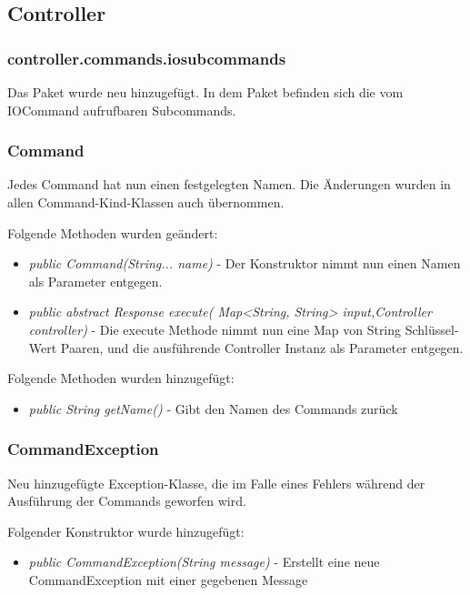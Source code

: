 \documentclass[parskip=full]{scrartcl}
\begin{document}
		\subsection{Controller}
		
		
			\subsubsection{controller.commands.iosubcommands}
				\hypertarget{controller:controller.commands.iosubcommands}{}
				Das Paket wurde neu hinzugefügt. In dem Paket befinden sich die vom IOCommand aufrufbaren Subcommands.
				
		
			\subsubsection{Command}
			\hypertarget{controller:commandSection}{}
				Jedes Command hat nun einen festgelegten Namen. Die Änderungen wurden in allen Command-Kind-Klassen auch übernommen.

				Folgende Methoden wurden geändert:
				\begin{itemize}
					\item \textit{public Command(String... name)} - Der Konstruktor nimmt nun einen Namen als Parameter entgegen.
					\item \textit{public abstract Response execute(	Map<String, String> input,Controller controller)} - Die execute Methode nimmt nun eine Map von String Schlüssel-Wert Paaren, und die ausführende Controller Instanz als Parameter entgegen.
				\end{itemize}	

				Folgende Methoden wurden hinzugefügt:
				\begin{itemize}
					\item \textit{ public String getName()} - Gibt den Namen des Commands zurück
				\end{itemize}
			
			\subsubsection{CommandException}
			Neu hinzugefügte Exception-Klasse, die im Falle eines Fehlers während der Ausführung der Commands geworfen wird. 
			
			Folgender Konstruktor wurde hinzugefügt:	
			\begin{itemize}
			\item \textit{public CommandException(String message)} - Erstellt eine neue CommandException mit einer gegebenen Message
			\end{itemize}
\end{document}
